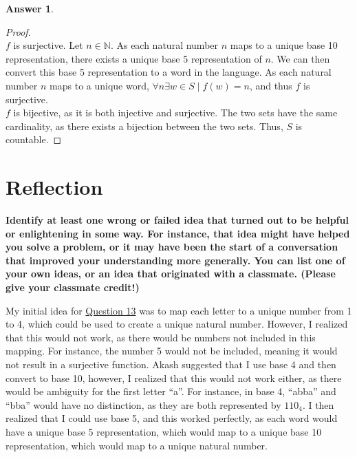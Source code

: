 \documentclass[article, 12pt]{article}
\theoremstyle{definition}
\newtheorem{answer}{Answer}
\newcommand{\nats}{\mathbb{N}}
\begin{document}
\begin{answer}
\begin{proof}
            \\[12pt]
            $f$ is surjective. Let $n \in \nats$. As each natural number $n$ maps to a unique base 10 representation, there exists a unique base 5 representation of $n$. We can then convert this base 5 representation to a word in the language. As each natural number $n$ maps to a unique word, $\forall n \exists w \in S \mid f(w) = n$, and thus $f$ is surjective.
            \\[12pt]
            $f$ is bijective, as it is both injective and surjective. The two sets have the same cardinality, as there exists a bijection between the two sets. Thus, $S$ is countable.
        \end{proof}
    \end{answer}
    \section{Reflection}
    \textbf{Identify at least one wrong or failed idea that turned out to be helpful or enlightening in some way. For instance, that idea might have helped you solve a problem, or it may have been the start of a conversation that improved your understanding more generally. You can list one of your own ideas, or an idea that originated with a classmate. (Please give your classmate credit!)}

    My initial idea for \hyperref[q:language]{Question 13} was to map each letter to a unique number from 1 to 4, which could be used to create a unique natural number. However, I realized that this would not work, as there would be numbers not included in this mapping. For instance, the number 5 would not be included, meaning it would not result in a surjective function. Akash suggested that I use base 4 and then convert to base 10, however, I realized that this would not work either, as there would be ambiguity for the first letter ``a''. For instance, in base 4, ``abba'' and ``bba'' would have no distinction, as they are both represented by $110_4$. I then realized that I could use base 5, and this worked perfectly, as each word would have a unique base 5 representation, which would map to a unique base 10 representation, which would map to a unique natural number. 
\end{document}
